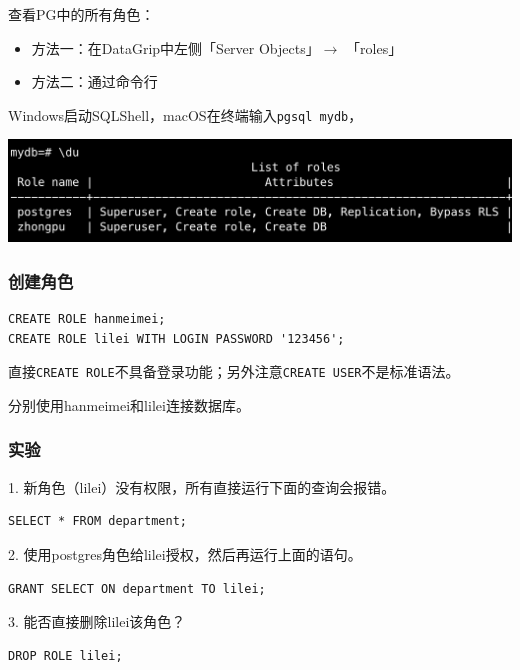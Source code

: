 \documentclass[aspectratio=169, 14pt]{beamer}
\begin{document}
\begin{frame}
查看PG中的所有角色：

\begin{itemize}
    \item 方法一：在DataGrip中左侧「Server Objects」$\rightarrow$ 「roles」
    \item 方法二：通过命令行
\end{itemize}

Windows启动SQLShell，macOS在终端输入\texttt{pgsql mydb}，

\includegraphics[width=\textwidth]{advanced/du}

\end{frame}

\begin{frame}[fragile]
    \frametitle{创建角色}

    \begin{verbatim}
CREATE ROLE hanmeimei;
CREATE ROLE lilei WITH LOGIN PASSWORD '123456';
    \end{verbatim}
直接\texttt{CREATE ROLE}不具备登录功能；另外注意\texttt{CREATE USER}不是标准语法。

 分别使用hanmeimei和lilei连接数据库。
\end{frame}

\begin{frame}[fragile]
    \frametitle{实验}
1. 新角色（lilei）没有权限，所有直接运行下面的查询会报错。
\begin{verbatim}
SELECT * FROM department;
\end{verbatim}
2. 使用postgres角色给lilei授权，然后再运行上面的语句。
\begin{verbatim}
GRANT SELECT ON department TO lilei;
\end{verbatim}
3. 能否直接删除lilei该角色？
\begin{verbatim}
DROP ROLE lilei;
\end{verbatim}

\end{frame}
\end{document}
